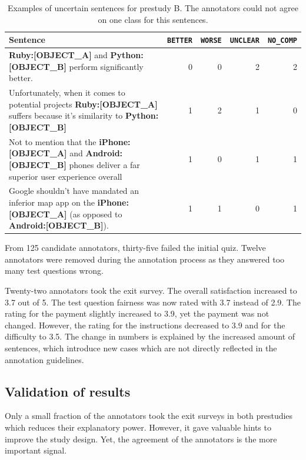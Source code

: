 \begin{table}[h]
\centering
\caption{Examples of uncertain sentences for prestudy B. The annotators could not agree on one class for this sentences. }
\label{tbl:pre_2_res}
\begin{tabularx}{\textwidth}{Xrrrr}
\toprule
 Sentence        & \texttt{BETTER} & \texttt{WORSE} & \texttt{UNCLEAR} & \texttt{NO\_COMP}          \\ \midrule
\textbf{{\color[HTML]{9A14B2}Ruby:{[}OBJECT\_A{]}}} and \textbf{{\color[HTML]{6CB219} Python:{[}OBJECT\_B{]}}} perform significantly better. & 0 & 0 & 2 & 2 \\

Unfortunately, when it comes to potential projects \textbf{{\color[HTML]{9A14B2}Ruby:{[}OBJECT\_A{]}}} suffers because it's similarity to \textbf{{\color[HTML]{6CB219} Python:{[}OBJECT\_B{]}}} & 1 & 2 & 1 & 0 \\


Not to mention that the \textbf{{\color[HTML]{9A14B2}iPhone:{[}OBJECT\_A{]}}} and \textbf{{\color[HTML]{6CB219} Android:{[}OBJECT\_B{]}}} phones deliver a far superior user experience overall & 1 & 0 & 1 & 1 \\

Google shouldn't have mandated an inferior map app on the \textbf{{\color[HTML]{9A14B2}iPhone:{[}OBJECT\_A{]}}} (as opposed to \textbf{{\color[HTML]{6CB219} Android:{[}OBJECT\_B{]}}}). & 1 & 1 & 0 & 1 \\



\bottomrule                              
\end{tabularx}
\end{table}


From 125 candidate annotators, thirty-five failed the initial quiz. Twelve annotators were removed during the annotation process as they answered too many test questions wrong.

Twenty-two annotators took the exit survey. The overall satisfaction increased to 3.7 out of 5. The test question fairness was now rated with 3.7  instead of 2.9. The rating for the payment slightly increased to 3.9, yet the payment was not changed. However, the rating for the instructions decreased to 3.9 and for the difficulty to 3.5.
The change in numbers is explained by the increased amount of sentences, which introduce new cases which are not directly reflected in the annotation guidelines.
 
\subsection{Validation of results}
Only a small fraction of the annotators took the exit surveys in both prestudies which reduces their explanatory power. However, it gave valuable hints to improve the study design. Yet, the agreement of the annotators is the more important signal.



